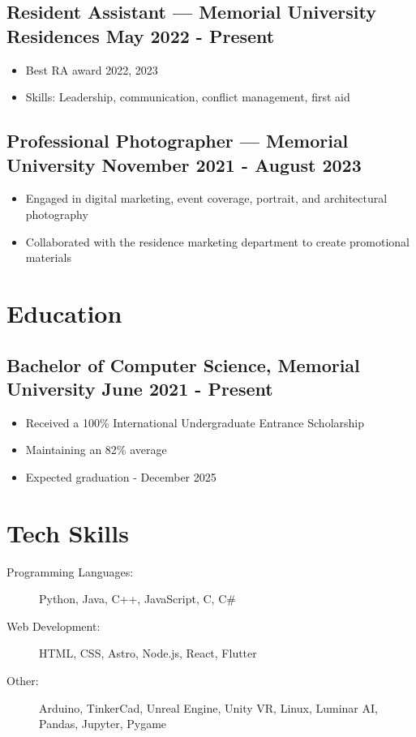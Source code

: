 \documentclass[10pt]{article}
\begin{document}
\subsection{Resident Assistant — Memorial University Residences \hfill May 2022 - Present}
\begin{itemize}
    \item Best RA award 2022, 2023
    \item Skills: Leadership, communication, conflict management, first aid
\end{itemize}



\subsection{Professional Photographer — Memorial University \hfill November 2021 - August 2023}
\begin{itemize}
    \item Engaged in digital marketing, event coverage, portrait, and architectural photography
    \item Collaborated with the residence marketing department to create promotional materials
\end{itemize}







\section{Education}
\subsection{Bachelor of Computer Science, Memorial University \hfill June 2021 - Present}
\begin{itemize}
    \item Received a 100\% International Undergraduate Entrance Scholarship
    \item Maintaining an 82\% average 
    \item Expected graduation - December 2025
    
\end{itemize}

\section{Tech Skills}
\begin{description}
    \item[Programming Languages:] Python, Java, C++, JavaScript, C, C\#
    \item[Web Development:] HTML, CSS, Astro, Node.js, React, Flutter
    \item[Other:] Arduino, TinkerCad, Unreal Engine, Unity VR, Linux, Luminar AI, Pandas, Jupyter, Pygame
\end{description}
\end{document}
